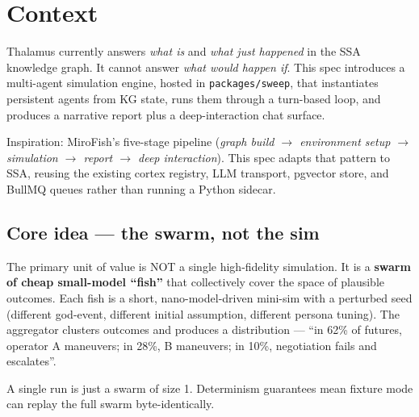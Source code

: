 



\makespecheader

\section{Context}
Thalamus currently answers \emph{what is} and \emph{what just happened} in the SSA knowledge graph. It cannot answer \emph{what would happen if}. This spec introduces a multi-agent simulation engine, hosted in \texttt{packages/sweep}, that instantiates persistent agents from KG state, runs them through a turn-based loop, and produces a narrative report plus a deep-interaction chat surface.

Inspiration: MiroFish's five-stage pipeline (\emph{graph build $\to$ environment setup $\to$ simulation $\to$ report $\to$ deep interaction}). This spec adapts that pattern to SSA, reusing the existing cortex registry, LLM transport, pgvector store, and BullMQ queues rather than running a Python sidecar.

\subsection*{Core idea --- the swarm, not the sim}
The primary unit of value is NOT a single high-fidelity simulation. It is a \textbf{swarm of cheap small-model ``fish''} that collectively cover the space of plausible outcomes. Each fish is a short, nano-model-driven mini-sim with a perturbed seed (different god-event, different initial assumption, different persona tuning). The aggregator clusters outcomes and produces a distribution --- ``in 62\% of futures, operator A maneuvers; in 28\%, B maneuvers; in 10\%, negotiation fails and escalates''.

A single run is just a swarm of size 1. Determinism guarantees mean fixture mode can replay the full swarm byte-identically.

